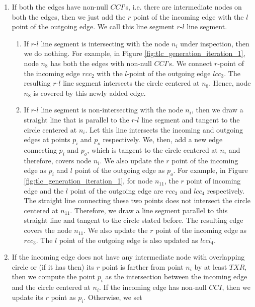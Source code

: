 \documentclass{llncs}
\begin{document}
\begin{enumerate} \itemsep0pt \parskip0pt 
  \item If both the edges have non-null $CCI$'s, i.e. there are intermediate nodes on both the
  edges, then we just add the $r$ point of the incoming edge with the $l$ point of the outgoing
  edge. We call this line segment $r$-$l$ line segment.
  \begin{enumerate} \itemsep0pt \parskip0pt 
    \item If $r$-$l$ line segment is intersecting with the node $n_i$ under inspection, then we
	  do nothing. For example, in Figure \ref{fig:tlc_generation_iteration_1}, node $n_{8}$ has
	   both the
	  edges with non-null $CCI$'s. We connect $r$-point of the incoming edge $rcc_2$ with 
	  the $l$-point
	  of the outgoing edge $lcc_3$. The resulting $r$-$l$ line segment intersects the circle
	  centered at $n_8$. Hence, node $n_8$ is covered by this newly added edge.
	 \item If $r$-$l$ line segment is non-intersecting with the node $n_i$, then we 
	 draw a straight
	 line that is parallel to the $r$-$l$ line segment and tangent to the circle centered at $n_i$. 
	 Let
	 this line intersects the incoming and outgoing edges at points $p_i$ and $p_o$ respectively. 
	 We,
	 then, add a new edge connecting $p_i$ and $p_o$, which is tangent to the circle centered at 
	 $n_i$
	 and therefore, covers node $n_i$. We also update the $r$ point of the incoming edge as $p_i$ 
	 and
	 $l$ point of the outgoing edge as $p_o$. For example, in Figure
	 \ref{fig:tlc_generation_iteration_1}, for node $n_{11}$, the $r$ point of incoming edge and the
	 $l$ point of the outgoing edge are $rcc_3$ and $lcc_4$ respectively. The straight 
	 line connecting
	 these two points does not intersect the circle centered at $n_{11}$. Therefore, we draw a line
	 segment parallel to this straight line and tangent to the circle stated before. 
	 The resulting edge
	 covers the node $n_{11}$. We also update the $r$ point of the incoming edge as $rcc_3$.  
	 The $l$ point of the outgoing edge
	 is also updated as $lcci_4$.
  \end{enumerate}
  \item If the incoming edge does not have any intermediate node with overlapping circle or (if it
  has then) its $r$ point is farther from point $n_i$ by at least $TXR$, then we compute the point
  $p_i$ as the intersection between the incoming edge and the circle centered at $n_i$. If the
  incoming edge has non-null $CCI$, then we update its $r$ point as $p_i$. Otherwise, we set 

\end{enumerate}
\end{document}
